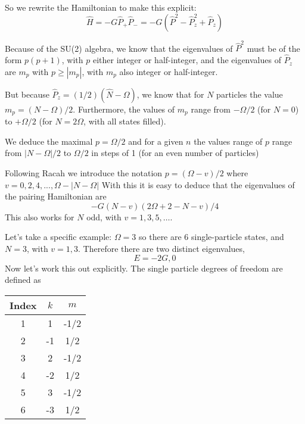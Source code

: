 \documentclass[graybox,sectrefs,envcountresetchap,open=right]{svmonodo}
\begin{document}
So we rewrite the Hamiltonian to make this explicit:
\[
\hat{H} = -G \hat{P}_+ \hat{P}_- 
= -G \left( \hat{P}^2 - \hat{P}_z^2 + \hat{P}_z\right)
\]


Because of the SU(2) algebra, we know that the eigenvalues of 
$\hat{P}^2$ must be of the form $p(p+1)$, with $p$ either integer or half-integer, and the eigenvalues of $\hat{P}_z$ 
are $m_p$ with $p \geq | m_p|$, with $m_p$ also integer or half-integer. 


But because $\hat{P}_z = (1/2)(\hat{N}-\Omega)$, we know that for $N$ particles 
the value $m_p = (N-\Omega)/2$. Furthermore, the values of $m_p$ range from 
$-\Omega/2$ (for $N=0$) to $+\Omega/2$ (for $N=2\Omega$, with all states filled). 

We deduce the maximal $p = \Omega/2$ and for a given $n$ the 
values range of $p$ range from $|N-\Omega|/2$ to $\Omega/2$ in steps of 1 
(for an even number of particles) 


Following Racah we introduce the notation
$p = (\Omega - v)/2$
where $v = 0, 2, 4,..., \Omega - |N-\Omega|$ 
With this it is easy to deduce that the eigenvalues of the pairing Hamiltonian are
\[
-G(N-v)(2\Omega +2-N-v)/4
\]
This also works for $N$ odd, with $v= 1,3,5, \dots$.



Let's take a specific example: $\Omega = 3$ so there are 6 single-particle states, 
and $N = 3$, with $v= 1,3$. Therefore there are two distinct eigenvalues, 
\[
E = -2G, 0
\]
Now let's work this out explicitly. The single particle degrees of freedom are defined as



{\small   %

\vspace{4mm}

\begin{tabular}{ccc}
\hline
\multicolumn{1}{c}{ Index } & \multicolumn{1}{c}{ $k$ } & \multicolumn{1}{c}{ $m$ } \\
\hline
1     & 1   & -1/2 \\
2     & -1  & 1/2  \\
3     & 2   & -1/2 \\
4     & -2  & 1/2  \\
5     & 3   & -1/2 \\
6     & -3  & 1/2  \\
\hline
\end{tabular}

\vspace{4mm}

}
\end{document}
